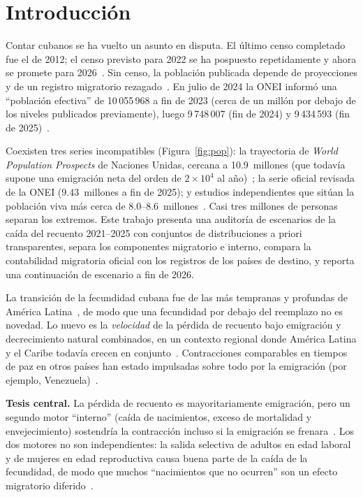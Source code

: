 \documentclass[11pt,a4paper]{article}
\begin{document}
\section{Introducción}

Contar cubanos se ha vuelto un asunto en disputa.
El último censo completado fue el de 2012; el censo previsto para 2022 se ha pospuesto repetidamente y ahora se promete para 2026~\citep{onei_census}.
Sin censo, la población publicada depende de proyecciones y de un registro migratorio rezagado~\citep{preston2001,un_wpp}.
En julio de 2024 la ONEI informó una ``población efectiva'' de 10\,055\,968 a fin de 2023 (cerca de un millón por debajo de los niveles publicados previamente), luego 9\,748\,007 (fin de 2024) y 9\,434\,593 (fin de 2025)~\citep{onei_revision,onei_2025}.

Coexisten tres series incompatibles (Figura~\ref{fig:pop}):
la trayectoria de \emph{World Population Prospects} de Naciones Unidas, cercana a 10.9~millones (que todavía supone una emigración neta del orden de $2\times10^4$ al año)~\citep{un_wpp,eclac2022};
la serie oficial revisada de la ONEI (9.43~millones a fin de 2025);
y estudios independientes que sitúan la población viva más cerca de 8.0--8.6~millones~\citep{albizu2023,albizu2024}.
Casi tres millones de personas separan los extremos.
Este trabajo presenta una auditoría de escenarios de la caída del recuento 2021--2025 con conjuntos de distribuciones a priori transparentes, separa los componentes migratorio e interno, compara la contabilidad migratoria oficial con los registros de los países de destino, y reporta una continuación de escenario a fin de 2026.

La transición de la fecundidad cubana fue de las más tempranas y profundas de América Latina~\citep{diazbriquets1982,hollerbach1984,diazbriquets2014}, de modo que una fecundidad por debajo del reemplazo no es novedad.
Lo nuevo es la \emph{velocidad} de la pérdida de recuento bajo emigración y decrecimiento natural combinados, en un contexto regional donde América Latina y el Caribe todavía crecen en conjunto~\citep{eclac2022,un_wpp}.
Contracciones comparables en tiempos de paz en otros países han estado impulsadas sobre todo por la emigración (por ejemplo, Venezuela)~\citep{coleman2006,pagegarcia2020}.

\textbf{Tesis central.}
La pérdida de recuento es mayoritariamente emigración, pero un segundo motor ``interno'' (caída de nacimientos, exceso de mortalidad y envejecimiento) sostendría la contracción incluso si la emigración se frenara~\citep{lee2014,lesthaeghe2010}.
Los dos motores no son independientes: la salida selectiva de adultos en edad laboral y de mujeres en edad reproductiva causa buena parte de la caída de la fecundidad, de modo que muchos ``nacimientos que no ocurren'' son un efecto migratorio diferido~\citep{bongaarts2009,diazbriquets2014}.
\end{document}

